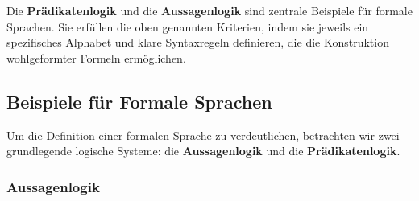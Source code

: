 \documentclass[main.tex]{subfiles}
\begin{document}
\begin{remark}
Die \textbf{Prädikatenlogik} und die \textbf{Aussagenlogik} sind zentrale Beispiele für formale Sprachen. Sie erfüllen die oben genannten Kriterien, indem sie jeweils ein spezifisches Alphabet und klare Syntaxregeln definieren, die die Konstruktion wohlgeformter Formeln ermöglichen.
\end{remark}

\subsection{Beispiele für Formale Sprachen}

Um die Definition einer formalen Sprache zu verdeutlichen, betrachten wir zwei grundlegende logische Systeme: die \textbf{Aussagenlogik} und die \textbf{Prädikatenlogik}.

\subsubsection{Aussagenlogik}
\end{document}

